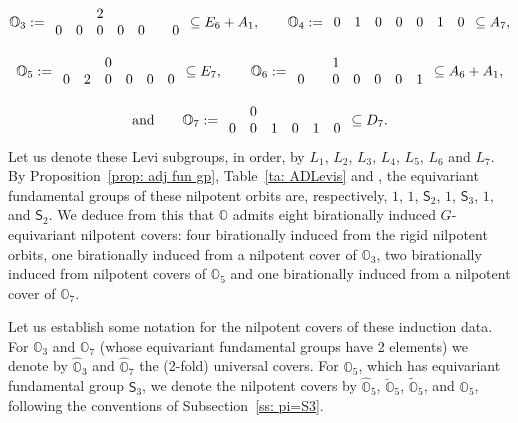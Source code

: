 \documentclass[11pt]{amsart}
\renewcommand{\O}{{\mathbb O}}
\newcommand{\Sym}{{\mathsf{S}}}
\newcommand{\covO}{\widetilde{\O}}
\newcommand{\hatO}{\widehat{\O}}
\newcommand{\breveO}{\breve{\O}}
\numberwithin{equation}{section}
\begin{document}
	$$\O_3:=\begin{array}{c c c c c c c}
		& & 2 & & & &  \\
		0 & 0 & 0 & 0 & 0 & & 0 \\
	\end{array}\subseteq E_6 + A_1,\quad \quad \O_4:=\begin{array}{c c c c c c c}
		0 & 1 & 0 & 0 & 0 & 1 & 0 \\
	\end{array}\subseteq A_7, $$
	
	$$\O_5:=\begin{array}{c c c c c c}
		& & 0 & & &  \\
		0 & 2 & 0 & 0 & 0 & 0 \\
	\end{array}\subseteq E_7,\quad \quad \O_6:=\begin{array}{c c c c c c c}
		& & 1 & & & &  \\
		0 &  & 0 & 0 & 0 & 0 & 1 \\
	\end{array}\subseteq A_6 + A_1, $$
	
	$$\mbox{and}\qquad\O_7:=\begin{array}{c c c c c c c}
		& 0 & & & &  \\
		0 & 0 & 1 & 0 & 1 & 0 \\
	\end{array}\subseteq D_7.$$
	Let us denote these Levi subgroups, in order, by $L_1$, $L_2$, $L_3$, $L_4$, $L_5$, $L_6$ and $L_7$. By Proposition~\ref{prop: adj fun gp}, Table~\ref{ta: ADLevis} and \cite[\S 8.4]{CM}, the equivariant fundamental groups of these nilpotent orbits are, respectively, $1$, $1$, $\Sym_2$, $1$, $\Sym_3$, $1$, and $\Sym_2$. We deduce from this that $\O$ admits eight birationally induced $G$-equivariant nilpotent covers: four birationally induced from the rigid nilpotent orbits, one birationally induced from a nilpotent cover of $\O_3$, two birationally induced from nilpotent covers of $\O_5$ and one birationally induced from a nilpotent cover of $\O_7$.
	
	Let us establish some notation for the nilpotent covers of these induction data. For $\O_3$ and $\O_7$ (whose equivariant fundamental groups have 2 elements) we denote by $\hatO_3$ and $\hatO_7$ the (2-fold) universal covers. For $\O_5$, which has equivariant fundamental group $\Sym_3$, we denote the nilpotent covers by $\hatO_5$, $\breveO_5$, $\covO_5$, and $\O_5$, following the conventions of Subsection~\ref{ss: pi=S3}.
	
\end{document}
